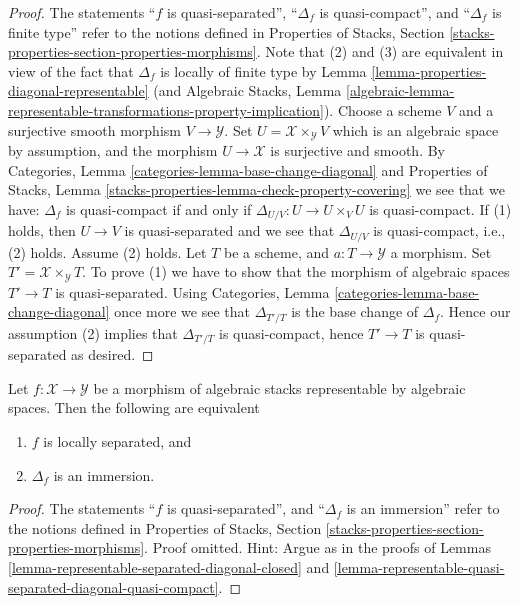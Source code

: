 \begin{proof}
The statements
``$f$ is quasi-separated'',
``$\Delta_f$ is quasi-compact'', and
``$\Delta_f$ is finite type''
refer to the notions defined in
Properties of Stacks,
Section \ref{stacks-properties-section-properties-morphisms}.
Note that (2) and (3) are equivalent in view of the fact that
$\Delta_f$ is locally of finite type by
Lemma \ref{lemma-properties-diagonal-representable}
(and
Algebraic Stacks, Lemma
\ref{algebraic-lemma-representable-transformations-property-implication}).
Choose a scheme $V$ and a surjective smooth morphism $V \to \mathcal{Y}$.
Set $U = \mathcal{X} \times_\mathcal{Y} V$ which is an algebraic
space by assumption, and the morphism $U \to \mathcal{X}$ is surjective
and smooth. By
Categories, Lemma \ref{categories-lemma-base-change-diagonal}
and
Properties of Stacks,
Lemma \ref{stacks-properties-lemma-check-property-covering}
we see that we have: $\Delta_f$ is quasi-compact if and only if
$\Delta_{U/V} : U \to  U \times_V U$ is quasi-compact.
If (1) holds, then $U \to V$ is quasi-separated and we see that
$\Delta_{U/V}$ is quasi-compact, i.e., (2) holds.
Assume (2) holds. Let $T$ be a scheme, and $a : T \to \mathcal{Y}$
a morphism. Set $T' = \mathcal{X} \times_\mathcal{Y} T$. To prove
(1) we have to show that the morphism of algebraic spaces $T' \to T$
is quasi-separated. Using
Categories, Lemma \ref{categories-lemma-base-change-diagonal}
once more we see that $\Delta_{T'/T}$ is the base change of
$\Delta_f$. Hence our assumption (2) implies that $\Delta_{T'/T}$
is quasi-compact, hence $T' \to T$ is quasi-separated as desired.
\end{proof}

\begin{lemma}
\label{lemma-representable-locally-separated-diagonal-immersion}
Let $f : \mathcal{X} \to \mathcal{Y}$ be a morphism of algebraic stacks
representable by algebraic spaces. Then the following are equivalent
\begin{enumerate}
\item $f$ is locally separated, and
\item $\Delta_f$ is an immersion.
\end{enumerate}
\end{lemma}

\begin{proof}
The statements ``$f$ is quasi-separated'', and ``$\Delta_f$ is an immersion''
refer to the notions defined in
Properties of Stacks,
Section \ref{stacks-properties-section-properties-morphisms}.
Proof omitted. Hint: Argue as in the proofs of
Lemmas \ref{lemma-representable-separated-diagonal-closed} and
\ref{lemma-representable-quasi-separated-diagonal-quasi-compact}.
\end{proof}






